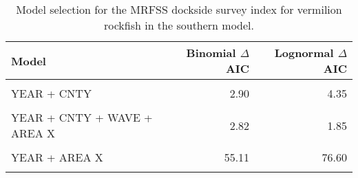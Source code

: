 \documentclass[
]{article}
\begin{document}
\begin{table}

\caption{\label{tab:tab-model-select-mrfss}Model selection for the MRFSS dockside survey index for vermilion rockfish in the southern model.}
\centering
\begin{tabular}[t]{lrr}
\toprule
Model & Binomial $\Delta$AIC & Lognormal $\Delta$AIC\\
\midrule
\cellcolor{gray!6}{1} & \cellcolor{gray!6}{111.56} & \cellcolor{gray!6}{146.83}\\
YEAR + CNTY & 2.90 & 4.35\\
\cellcolor{gray!6}{YEAR + CNTY + WAVE} & \cellcolor{gray!6}{6.40} & \cellcolor{gray!6}{0.00}\\
YEAR + CNTY + WAVE + AREA X & 2.82 & 1.85\\
\cellcolor{gray!6}{YEAR + WAVE + AREA X} & \cellcolor{gray!6}{57.46} & \cellcolor{gray!6}{75.30}\\
\addlinespace
YEAR + AREA X & 55.11 & 76.60\\
\cellcolor{gray!6}{YEAR + CNTY + AREA X} & \cellcolor{gray!6}{0.00} & \cellcolor{gray!6}{6.19}\\
\bottomrule
\end{tabular}
\end{table}

\FloatBarrier
\end{document}

